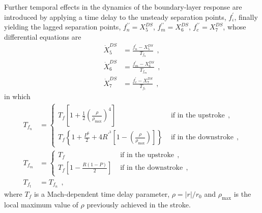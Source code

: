 \documentclass[12pt,a4paper,oneside,english]{abntex2} %
\newcommand{\abs}[1]{\lvert#1\rvert}
\def\lb{\left[}
\def\rb{\right]}
\def\lp{\left(}
\def\rp{\right)}
\def\maxim{_\text{max}}
\begin{document}
Further temporal effects in the dynamics of the boundary-layer response are introduced by applying a time delay to the unsteady separation points, $f^\prime_\iota$, finally yielding the lagged separation points, $f_n^{\prime\prime}=X_5^{DS}$, $f_m^{\prime\prime}=X_6^{DS}$, $f_c^{\prime\prime}=X_7^{DS}$, whose differential equations are
\begin{align}
    \dot{X}_{5}^{DS} &= \frac{f_n^{\prime}-X_{5}^{DS}}{T_{f_n}} \ \ ,
    \label{eq:f2prime_n} 
    \\
    \dot{X}_{6}^{DS} &= \frac{f_m^{\prime}-X_{6}^{DS}}{T_{f_m}} \ \ ,
    \label{eq:f2prime_m} 
    \\
    \dot{X}_{7}^{DS} &= \frac{f_c^{\prime}-X_{7}^{DS}}{T_{f_t}} \ \ , 
    \label{eq:f2prime_t} 
\end{align}
in which
\begin{align}
    T_{f_n} &=
    \begin{cases}
        T_{f} \lb 1 + \frac{1}{2}\lp\frac{\rho}{\rho\maxim}\rp^4 \rb &\text{ if in the upstroke} \ \ ,
        \\
        T_{f} \left\{ 1 + \frac{P^6}{2} + 4R^{\prime^3} \lb 1-\lp\frac{\rho}{\rho\maxim}\rp \rb \right\} &\text{ if in the downstroke} \ \ ,
    \end{cases}
    \label{eq:Tf_n}
    \\
    T_{f_m} &=
    \begin{cases}
        T_{f} &\text{ if in the upstroke} \ \ ,
        \\
        T_{f} \lb1-\frac{R\lp1-P\rp}{2}\rb &\text{ if in the downstroke} \ \ ,
    \end{cases}
    \label{eq:Tf_m}
    \\
    T_{f_t} &= T_{f_n} \ \ ,
    \label{eq:Tf_t}
\end{align}
where $T_{f}$ is a Mach-dependent time delay parameter, $\rho = \abs{r}/{r_0}$ and $\rho\maxim$ is the local maximum value of $\rho$ previously achieved in the stroke.
\end{document}
